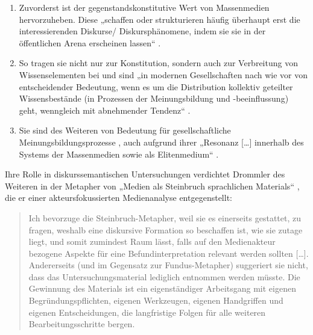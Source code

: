 \begin{enumerate}
\def\labelenumi{\arabic{enumi}.}
\item
  Zuvorderst ist der gegenstandskonstitutive Wert von Massenmedien hervorzuheben. Diese „schaffen oder strukturieren häufig überhaupt erst die interessierenden Diskurse/ Diskursphänomene, indem sie sie in der öffentlichen Arena erscheinen lassen`` \autocite[231]{drommlerNationaleIdentitaetBerliner2024}.
\item
  So tragen sie nicht nur zur Konstitution, sondern auch zur Verbreitung von Wissenselementen bei und sind „in modernen Gesellschaften nach wie vor von entscheidender Bedeutung, wenn es um die Distribution kollektiv geteilter Wissensbestände (in Prozessen der Meinungsbildung und -beeinflussung) geht, wenngleich mit abnehmender Tendenz`` \autocite[234]{drommlerNationaleIdentitaetBerliner2024}.
\item
  Sie sind des Weiteren von Bedeutung für gesellschaftliche Meinungsbildungsprozesse \autocite[236]{drommlerNationaleIdentitaetBerliner2024}, auch aufgrund ihrer „Resonanz {[}\ldots{]} innerhalb des Systems der Massenmedien sowie als Elitenmedium`` \autocite[237]{drommlerNationaleIdentitaetBerliner2024}.
\end{enumerate}

Ihre Rolle in diskurssemantischen Untersuchungen verdichtet Drommler des Weiteren in der Metapher von „Medien als Steinbruch sprachlichen Materials`` \autocite*[232]{drommlerNationaleIdentitaetBerliner2024}, die er einer akteursfokussierten Medienanalyse entgegenstellt:

\begin{quote}
Ich bevorzuge die Steinbruch-Metapher, weil sie es einerseits gestattet, zu fragen, weshalb eine diskursive Formation so beschaffen ist, wie sie zutage liegt, und somit zumindest Raum lässt, falls auf den Medienakteur bezogene Aspekte für eine Befundinterpretation relevant werden sollten {[}\ldots{]}. Andererseits (und im Gegensatz zur Fundus-Metapher) suggeriert sie nicht, dass das Untersuchungsmaterial lediglich entnommen werden müsste. Die Gewinnung des Materials ist ein eigenständiger Arbeitsgang mit eigenen Begründungspflichten, eigenen Werkzeugen, eigenen Handgriffen und eigenen Entscheidungen, die langfristige Folgen für alle weiteren Bearbeitungsschritte bergen. \autocite[232]{drommlerNationaleIdentitaetBerliner2024}
\end{quote}


